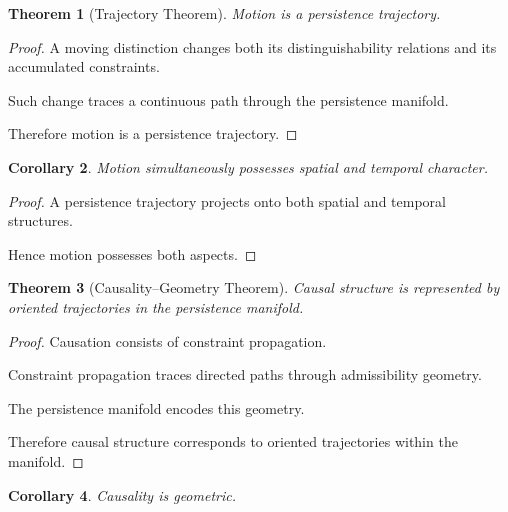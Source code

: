\documentclass[12pt,oneside]{article}
\newtheorem{theorem}{Theorem}[section] \newtheorem{lemma}[theorem]{Lemma} \newtheorem{proposition}[theorem]{Proposition} \newtheorem{corollary}[theorem]{Corollary}
\theoremstyle{definition}
\begin{document}
\begin{theorem}[Trajectory Theorem]

Motion is a persistence trajectory.

\end{theorem}

\begin{proof}

A moving distinction changes both its distinguishability relations and its accumulated constraints.

Such change traces a continuous path through the persistence manifold.

Therefore motion is a persistence trajectory.

\end{proof}

\begin{corollary}

Motion simultaneously possesses spatial and temporal character.

\end{corollary}

\begin{proof}

A persistence trajectory projects onto both spatial and temporal structures.

Hence motion possesses both aspects.

\end{proof}

\begin{theorem}[Causality–Geometry Theorem]

Causal structure is represented by oriented trajectories in the persistence manifold.

\end{theorem}

\begin{proof}

Causation consists of constraint propagation.

Constraint propagation traces directed paths through admissibility geometry.

The persistence manifold encodes this geometry.

Therefore causal structure corresponds to oriented trajectories within the manifold.

\end{proof}

\begin{corollary}

Causality is geometric.

\end{corollary}
\end{document}

